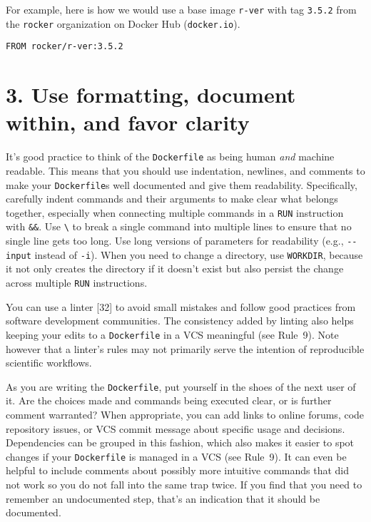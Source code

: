 \documentclass[10pt,letterpaper]{article}
\begin{document}
For example, here is how we would use a base image \texttt{r-ver} with
tag \texttt{3.5.2} from the \texttt{rocker} organization on Docker Hub
(\texttt{docker.io}).

\begin{verbatim}
FROM rocker/r-ver:3.5.2
\end{verbatim}

\hypertarget{use-formatting-document-within-and-favor-clarity}{%
\section{3. Use formatting, document within, and favor
clarity}\label{use-formatting-document-within-and-favor-clarity}}

It's good practice to think of the \texttt{Dockerfile} as being human
\emph{and} machine readable. This means that you should use indentation,
newlines, and comments to make your \texttt{Dockerfile}s well documented
and give them readability. Specifically, carefully indent commands and
their arguments to make clear what belongs together, especially when
connecting multiple commands in a \texttt{RUN} instruction with
\texttt{\&\&}. Use \texttt{\textbackslash{}} to break a single command
into multiple lines to ensure that no single line gets too long. Use
long versions of parameters for readability (e.g., \texttt{-\/-input}
instead of \texttt{-i}). When you need to change a directory, use
\texttt{WORKDIR}, because it not only creates the directory if it
doesn't exist but also persist the change across multiple \texttt{RUN}
instructions.

You can use a linter {[}32{]} to avoid small mistakes and follow good
practices from software development communities. The consistency added
by linting also helps keeping your edits to a \texttt{Dockerfile} in a
VCS meaningful (see Rule~9). Note however that a linter's rules may not
primarily serve the intention of reproducible scientific workflows.

As you are writing the \texttt{Dockerfile}, put yourself in the shoes of
the next user of it. Are the choices made and commands being executed
clear, or is further comment warranted? When appropriate, you can add
links to online forums, code repository issues, or VCS commit message
about specific usage and decisions. Dependencies can be grouped in this
fashion, which also makes it easier to spot changes if your
\texttt{Dockerfile} is managed in a VCS (see Rule~9). It can even be
helpful to include comments about possibly more intuitive commands that
did not work so you do not fall into the same trap twice. If you find
that you need to remember an undocumented step, that's an indication
that it should be documented.
\end{document}
